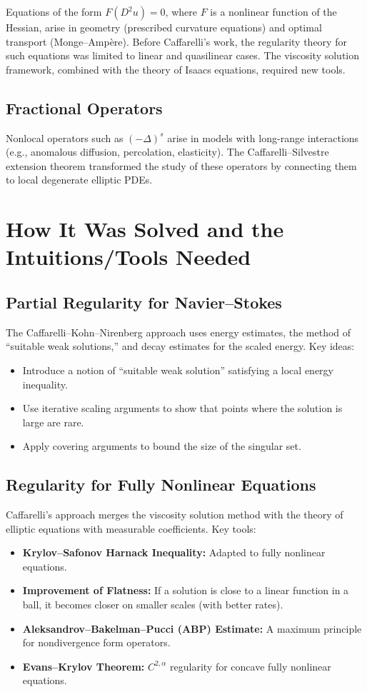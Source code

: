 Equations of the form $F(D^2 u) = 0$, where $F$ is a nonlinear function of the Hessian, arise in geometry (prescribed curvature equations) and optimal transport (Monge--Amp\`ere). Before Caffarelli's work, the regularity theory for such equations was limited to linear and quasilinear cases. The viscosity solution framework, combined with the theory of Isaacs equations, required new tools.

\subsection{Fractional Operators}

Nonlocal operators such as $(-\Delta)^s$ arise in models with long-range interactions (e.g., anomalous diffusion, percolation, elasticity). The Caffarelli--Silvestre extension theorem transformed the study of these operators by connecting them to local degenerate elliptic PDEs.

\section{How It Was Solved and the Intuitions/Tools Needed}

\subsection{Partial Regularity for Navier--Stokes}

The Caffarelli--Kohn--Nirenberg approach uses energy estimates, the method of ``suitable weak solutions,'' and decay estimates for the scaled energy. Key ideas:
\begin{itemize}
    \item Introduce a notion of ``suitable weak solution'' satisfying a local energy inequality.
    \item Use iterative scaling arguments to show that points where the solution is large are rare.
    \item Apply covering arguments to bound the size of the singular set.
\end{itemize}

\subsection{Regularity for Fully Nonlinear Equations}

Caffarelli's approach merges the viscosity solution method with the theory of elliptic equations with measurable coefficients. Key tools:
\begin{itemize}
    \item \textbf{Krylov--Safonov Harnack Inequality:} Adapted to fully nonlinear equations.
    \item \textbf{Improvement of Flatness:} If a solution is close to a linear function in a ball, it becomes closer on smaller scales (with better rates).
    \item \textbf{Aleksandrov--Bakelman--Pucci (ABP) Estimate:} A maximum principle for nondivergence form operators.
    \item \textbf{Evans--Krylov Theorem:} $C^{2,\alpha}$ regularity for concave fully nonlinear equations.
\end{itemize}

